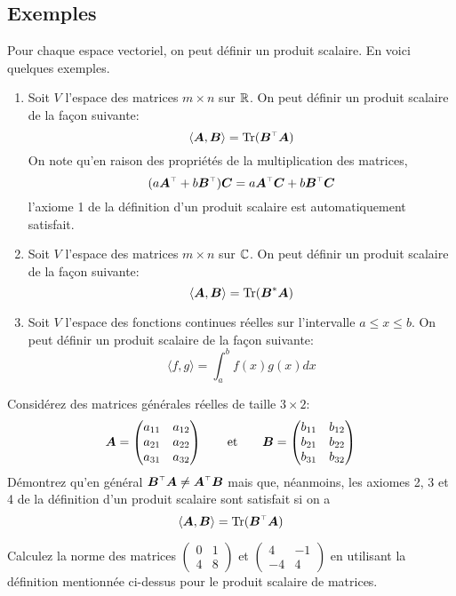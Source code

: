 \subsection{Exemples}
Pour chaque espace vectoriel, on peut définir un produit scalaire.  En voici quelques exemples.
\begin{enumerate}
\item Soit $V$ l'espace des matrices $m\times n$ sur $\mathbb{R}$. On peut définir un produit
scalaire de la façon suivante:
\[
\langle \matA, \matB \rangle = \tr(\transp{\matB}\matA)
\]
On note qu'en raison des propriétés de la multiplication des matrices, 
\[
(a\transp{\matA} + b\transp{\matB}) \matC = a\transp{\matA}\matC + b\transp{\matB}\matC
\]
l'axiome 1 de la définition d'un produit scalaire est automatiquement satisfait.
\item Soit $V$ l'espace des matrices $m\times n$ sur $\mathbb{C}$. On peut définir un produit
scalaire de la façon suivante:
\[
\langle \boldsymbol{A}, \boldsymbol{B} \rangle = \operatorname{Tr}(\boldsymbol{B}^*\boldsymbol{A})
\]
\item Soit $V$ l'espace des fonctions continues réelles sur l'intervalle $a\leq x \leq b$.
On peut définir un produit scalaire de la façon suivante:
\[
\langle f, g \rangle = \int_a^b f(x) g(x) dx
\]
\end{enumerate}

\begin{exerciceB}
Considérez des matrices générales réelles de taille $3\times 2$:
\[
\boldsymbol{A} = \begin{pmatrix}
a_{11} & a_{12} \\
a_{21} & a_{22} \\
a_{31} & a_{32}
\end{pmatrix}
\qquad \mbox{et}\qquad\boldsymbol{B} = \begin{pmatrix}
b_{11} & b_{12} \\
b_{21} & b_{22} \\
b_{31} & b_{32}
\end{pmatrix}
\]
Démontrez qu'en général $\transp{\matB}\matA \neq \transp{\matA}\matB$ mais que, néanmoins,
les axiomes 2, 3 et 4 de la définition d'un produit scalaire sont satisfait si on a
\[
\langle \matA, \matB \rangle = \tr(\transp{\matB}\matA)
\]
\end{exerciceB}

\begin{exerciceB}
Calculez la norme des matrices  $\displaystyle \begin{pmatrix}
0 & 1 \\
4 & 8
\end{pmatrix}$ et $\displaystyle \begin{pmatrix}
4 & -1 \\
-4 & 4
\end{pmatrix}$ en utilisant la définition mentionnée ci-dessus pour le produit scalaire
de matrices.
\end{exerciceB}

